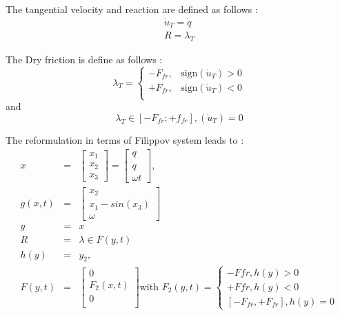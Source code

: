 \documentclass[10pt]{article}
\begin{document}
The tangential velocity and reaction are defined as follows :
\begin{eqnarray}
  \dot u_T = \dot q \\
  R= \lambda_T
\end{eqnarray}

The Dry friction is define as follows :
\begin{equation}
  \lambda_T=\left\{\begin{array}{ll}
  -F_{fr}, & \text{sign}(\dot u_T) > 0\\
  +F_{fr}, & \text{sign}(\dot u_T) < 0\\
  \end{array}\right. 
\end{equation}
and 
 \begin{equation}
  \lambda_T \in [-F_{fr};+f_{fr}], (\dot u_T) = 0
\end{equation}


The reformulation in terms of Filippov system leads to :
\begin{eqnarray}
  x&=& \left[\begin{array}{c}
  x_1 \\
  x_2 \\
  x_3
  \end{array}\right]=
   \left[\begin{array}{c}
  q \\
  \dot q \\
  \omega t
  \end{array}\right], \\
  g(x,t) &=& \left[\begin{array}{c}
  x_2 \\
  x_1 - sin(x_3) \\ 
  \omega
  \end{array}\right] \\
  y&=&x \\
  R& =&\lambda \in F(y,t) \\
  h(y) & = & y_2,\\
F(y,t) &=& \left[\begin{array}{c}
  0 \\
  F_2(x,t)\\
  0 \\
  \end{array}\right] \text{with } F_2(y,t)=
\begin{cases}
  -F{fr}, h(y) > 0 \\
  +F{fr}, h(y) < 0 \\
   [-F_{fr}, +F_{fr}], h(y) = 0
\end{cases}
\end{eqnarray}
\end{document}
